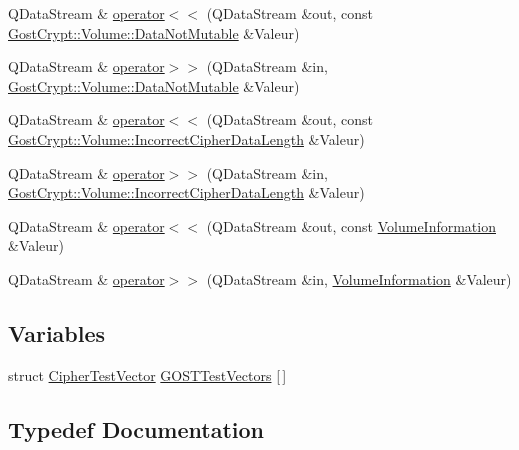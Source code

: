 \begin{DoxyCompactItemize}
\item 
Q\+Data\+Stream \& \hyperlink{namespace_gost_crypt_1_1_volume_ae1b64208f9f99600dabd5c92df69d1af}{operator$<$$<$} (Q\+Data\+Stream \&out, const \hyperlink{class_gost_crypt_1_1_volume_1_1_data_not_mutable}{Gost\+Crypt\+::\+Volume\+::\+Data\+Not\+Mutable} \&Valeur)
\item 
Q\+Data\+Stream \& \hyperlink{namespace_gost_crypt_1_1_volume_a478dc4d109f6644f530ad7942c0b3a2a}{operator$>$$>$} (Q\+Data\+Stream \&in, \hyperlink{class_gost_crypt_1_1_volume_1_1_data_not_mutable}{Gost\+Crypt\+::\+Volume\+::\+Data\+Not\+Mutable} \&Valeur)
\item 
Q\+Data\+Stream \& \hyperlink{namespace_gost_crypt_1_1_volume_ae890b9a8fa6dd352165c3128e36d6e49}{operator$<$$<$} (Q\+Data\+Stream \&out, const \hyperlink{class_gost_crypt_1_1_volume_1_1_incorrect_cipher_data_length}{Gost\+Crypt\+::\+Volume\+::\+Incorrect\+Cipher\+Data\+Length} \&Valeur)
\item 
Q\+Data\+Stream \& \hyperlink{namespace_gost_crypt_1_1_volume_a5dd91e6488caa4050088dfee8fbf9c86}{operator$>$$>$} (Q\+Data\+Stream \&in, \hyperlink{class_gost_crypt_1_1_volume_1_1_incorrect_cipher_data_length}{Gost\+Crypt\+::\+Volume\+::\+Incorrect\+Cipher\+Data\+Length} \&Valeur)
\item 
Q\+Data\+Stream \& \hyperlink{namespace_gost_crypt_1_1_volume_a0b2581ec3bb246b3da07a5a7cc4a04ad}{operator$<$$<$} (Q\+Data\+Stream \&out, const \hyperlink{struct_gost_crypt_1_1_volume_1_1_volume_information}{Volume\+Information} \&Valeur)
\item 
Q\+Data\+Stream \& \hyperlink{namespace_gost_crypt_1_1_volume_ab2b8e613e6ffb8e0177bafa587bf70ae}{operator$>$$>$} (Q\+Data\+Stream \&in, \hyperlink{struct_gost_crypt_1_1_volume_1_1_volume_information}{Volume\+Information} \&Valeur)
\end{DoxyCompactItemize}
\subsection*{Variables}
\begin{DoxyCompactItemize}
\item 
struct \hyperlink{struct_gost_crypt_1_1_volume_1_1_cipher_test_vector}{Cipher\+Test\+Vector} \hyperlink{namespace_gost_crypt_1_1_volume_aa7281bb706851590378d63cf2f730de7}{G\+O\+S\+T\+Test\+Vectors} \mbox{[}$\,$\mbox{]}
\end{DoxyCompactItemize}


\subsection{Typedef Documentation}
\mbox{\label{namespace_gost_crypt_1_1_volume_ad32c730cdf3a63d2bafbac0f63f0740f}} 

